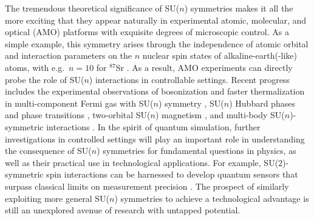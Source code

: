 \documentclass[nofootinbib,notitlepage,11pt]{revtex4-2}
\newcommand{\1}{\mathds{1}}
\begin{document}
The tremendous theoretical significance of SU($n$) symmetries makes it all the more exciting that they appear naturally in experimental atomic, molecular, and optical (AMO) platforms \cite{wu2003exact, cazalilla2009ultracold, gorshkov2010twoorbital, beverland2016realizing, cazalilla2014ultracold, taie2012su, hofrichter2016direct, cappellini2014direct, scazza2014observation, zhang2014spectroscopic, goban2018emergence, perlin2019effective} with exquisite degrees of microscopic control.
As a simple example, this symmetry arises through the independence of atomic orbital and interaction parameters on the $n$ nuclear spin states of alkaline-earth(-like) atoms, with e.g.~$n=10$ for ${}^{87}$Sr \cite{wu2003exact, cazalilla2009ultracold, cazalilla2014ultracold}.
As a result, AMO experiments can directly probe the role of SU($n$) interactions in controllable settings.
Recent progress includes the experimental observations of bosonization and faster thermalization in multi-component Fermi gas with SU($n$) symmetry \cite{song2020evidence, sonderhouse2020thermodynamics}, SU($n$) Hubbard phases and phase transitions \cite{taie2012su, hofrichter2016direct, taie2020observation}, two-orbital SU($n$) magnetism \cite{cappellini2014direct, scazza2014observation, zhang2014spectroscopic}, and multi-body SU($n$)-symmetric interactions \cite{goban2018emergence, perlin2019effective}.
In the spirit of quantum simulation, further investigations in controlled settings will play an important role in understanding the consequence of SU($n$) symmetries for fundamental questions in physics, as well as their practical use in technological applications.
For example, SU($2$)-symmetric spin interactions can be harnessed to develop quantum sensors that surpass classical limits on measurement precision \cite{he2019engineering, perlin2020spin}.
The prospect of similarly exploiting more general SU($n$) symmetries to achieve a technological advantage is still an unexplored avenue of research with untapped potential.
\end{document}
